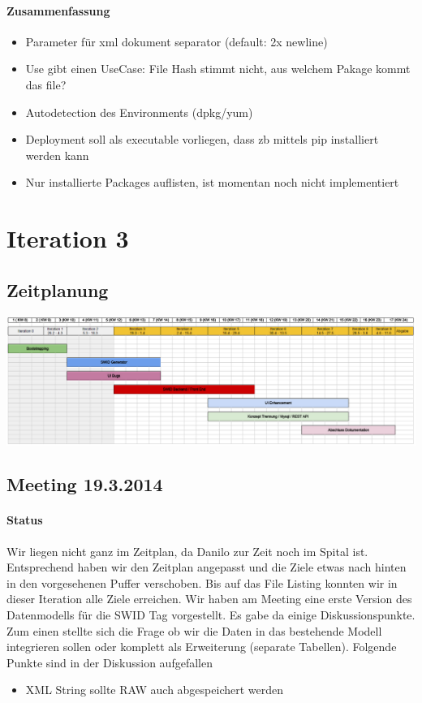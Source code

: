 \paragraph{Zusammenfassung}
\begin{itemize}
\item Parameter für xml dokument separator (default: 2x newline)
\item Use gibt einen UseCase: File Hash stimmt nicht, aus welchem Pakage kommt das file?
\item Autodetection des Environments (dpkg/yum)
\item Deployment soll als executable vorliegen, dass zb mittels pip installiert werden kann
\item Nur installierte Packages auflisten, ist momentan noch nicht implementiert
\end{itemize}

\section{Iteration 3}
\subsection{Zeitplanung}
\includegraphics[width=\textwidth]{images/zeitplanung/Iteration3.jpg}
\subsection{Meeting 19.3.2014}
\paragraph{Status}

Wir liegen nicht ganz im Zeitplan, da Danilo zur Zeit noch im Spital ist. Entsprechend haben wir den Zeitplan angepasst und die Ziele etwas nach hinten in den vorgesehenen Puffer verschoben. Bis auf das File Listing konnten wir in dieser Iteration alle Ziele erreichen. Wir haben am Meeting eine erste Version des Datenmodells für die SWID Tag vorgestellt. Es gabe da einige Diskussionspunkte. Zum einen stellte sich die Frage ob wir die Daten in das bestehende Modell integrieren sollen oder komplett als Erweiterung (separate Tabellen). Folgende Punkte sind in der Diskussion aufgefallen
\begin{itemize}
\item XML String sollte RAW auch abgespeichert werden
\end{itemize}

